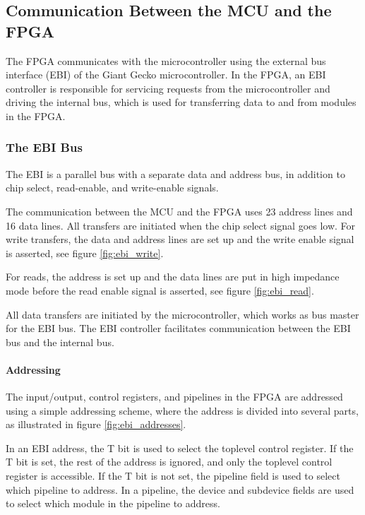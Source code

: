 
\FloatBarrier
\subsection{Communication Between the MCU and the FPGA}\label{section:fpga-buses}

The FPGA communicates with the microcontroller using the external bus interface
(EBI) of the Giant Gecko microcontroller. In the FPGA, an EBI controller is responsible
for servicing requests from the microcontroller and driving the internal bus, which
is used for transferring data to and from modules in the FPGA.

\subsubsection{The EBI Bus}
The EBI\cite{efm_ebi} is a parallel bus with a separate data and address bus, in
addition to chip select, read-enable, and write-enable signals.

The communication between the MCU and the FPGA uses 23 address lines and 16 data
lines. All transfers are initiated when the chip select signal goes low. For
write transfers, the data and address lines are set up and the write enable
signal is asserted, see figure \ref{fig:ebi_write}.	

For reads, the address is set up and the data lines are put in high impedance mode
before the read enable signal is asserted, see figure \ref{fig:ebi_read}.




All data transfers are initiated by the microcontroller, which works as bus
master for the EBI bus. The EBI controller facilitates communication between
the EBI bus and the internal bus.

\FloatBarrier
\paragraph{Addressing}

The input/output, control registers, and pipelines in the FPGA are addressed
using a simple addressing scheme, where the address is divided into several
parts, as illustrated in figure \ref{fig:ebi_addresses}.



In an EBI address, the T bit is used to select the toplevel control register.
If the T bit is set, the rest of the address is ignored, and only the toplevel
control register is accessible. If the T bit is not set, the pipeline field is
used to select which pipeline to address. In a pipeline, the device
and subdevice fields are used to select which module in the pipeline to address.


